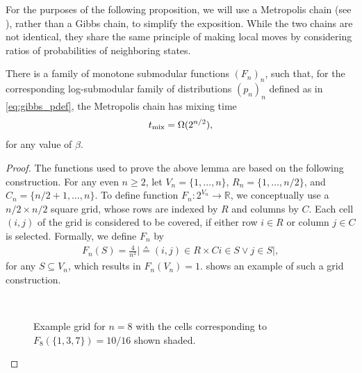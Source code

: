 For the purposes of the following proposition, we will use a Metropolis chain (see ), rather than a Gibbs chain, to simplify the exposition.
While the two chains are not identical, they share the same principle of making local moves by considering ratios of probabilities of neighboring states.
\begin{prop}
There is a family of monotone submodular functions $(F_n)_n$, such that, for the corresponding log-submodular family of distributions $(p_n)_n$ defined as in \eqref{eq:gibbs_pdef}, the Metropolis chain has mixing time
\begin{align*}
  t_{\mathrm{mix}}  = \Omega(2^{n/2}),
\end{align*}
for any value of $\beta$.
\end{prop}

\begin{proof}
The functions used to prove the above lemma are based on the following construction.
For any even $n \geq 2$, let $V_n = \{1,\ldots,n\}$, $R_n = \{1,\ldots,n/2\}$, and $C_n = \{n/2+1,\ldots,n\}$.
To define function $F_n : 2^{V_n} \to \mathbb{R}$, we conceptually use a $n/2 \times n/2$ square grid, whose rows are indexed by $R$ and columns by $C$.
Each cell $(i, j)$ of the grid is considered to be covered, if either row $i \in R$ or column $j \in C$ is selected.
Formally, we define $F_n$ by
\begin{align*}
  F_n(S) = \frac{4}{n^2}\big\vert \sdef{(i, j) \in R \times C}{i \in S \lor j \in S}\big\vert,
\end{align*}
for any $S \subseteq V_n$, which results in $F_n(V_n) = 1$.
 shows an example of such a grid construction.

\begin{figure}[htb]
  \centering
  \\[1em]
  \caption{Example grid for $n = 8$ with the cells corresponding to $F_8(\{1,3,7\}) = 10/16$ shown shaded.}
  \label{fig:submod_grid}
\end{figure}

\newcommand{\hrn}{\mathcal{R}_n}
\newcommand{\hcn}{\mathcal{C}_n}
\newcommand{\hkn}{\mathcal{K}_n}
\newcommand{\htn}{\mathcal{T}_n}


\end{proof}
